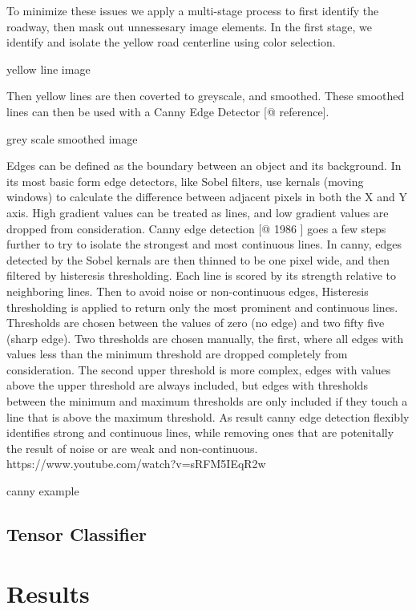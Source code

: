 \documentclass[]{elsarticle} %
\begin{document}
To minimize these issues we apply a multi-stage process to first
identify the roadway, then mask out unnessesary image elements. In the
first stage, we identify and isolate the yellow road centerline using
color selection.

yellow line image

Then yellow lines are then coverted to greyscale, and smoothed. These
smoothed lines can then be used with a Canny Edge Detector {[}@
reference{]}.

grey scale smoothed image

Edges can be defined as the boundary between an object and its
background. In its most basic form edge detectors, like Sobel filters,
use kernals (moving windows) to calculate the difference between
adjacent pixels in both the X and Y axis. High gradient values can be
treated as lines, and low gradient values are dropped from
consideration. Canny edge detection {[}@ 1986 {]} goes a few steps
further to try to isolate the strongest and most continuous lines. In
canny, edges detected by the Sobel kernals are then thinned to be one
pixel wide, and then filtered by histeresis thresholding. Each line is
scored by its strength relative to neighboring lines. Then to avoid
noise or non-continuous edges, Histeresis thresholding is applied to
return only the most prominent and continuous lines. Thresholds are
chosen between the values of zero (no edge) and two fifty five (sharp
edge). Two thresholds are chosen manually, the first, where all edges
with values less than the minimum threshold are dropped completely from
consideration. The second upper threshold is more complex, edges with
values above the upper threshold are always included, but edges with
thresholds between the minimum and maximum thresholds are only included
if they touch a line that is above the maximum threshold. As result
canny edge detection flexibly identifies strong and continuous lines,
while removing ones that are potenitally the result of noise or are weak
and non-continuous. https://www.youtube.com/watch?v=sRFM5IEqR2w

canny example

\subsection{Tensor Classifier}\label{tensor-classifier}

\section{Results}\label{results}
\end{document}

